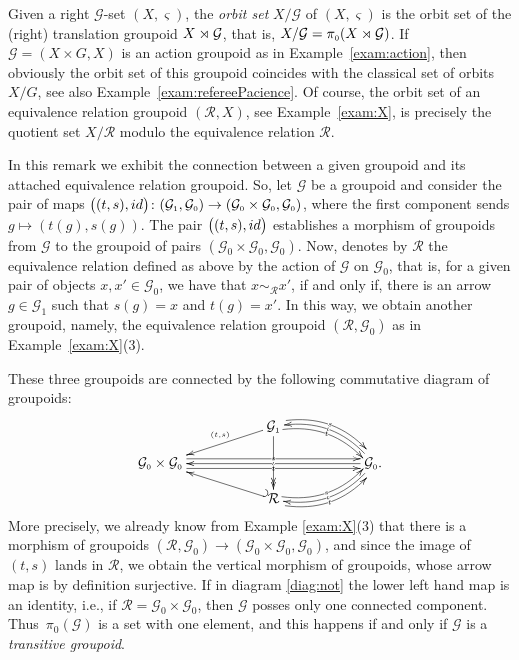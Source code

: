 \documentclass[11pt]{article}
\numberwithin{equation}{section}
\newcommand{\Go}{\cG_{\Sscript{0}}}
\newcommand{\Ga}{\cG_{\Sscript{1}}}
\newcommand{\cG}{{\mathcal G}}
\newcommand{\cR}{{\mathcal R}}
\newcommand{\Sscript}[1]{\scriptscriptstyle{#1}}
\begin{document}
Given a right $\cG$-set $(X,\varsigma)$, the \emph{orbit set} $X/\cG$ of $(X,\varsigma)$ is the orbit set of the (right) translation groupoid $X \rJoin \cG$, that is, $X/\cG=\pi_{\Sscript{0}}(X \rJoin \cG)$. If $\cG=(X\times G, X)$ is an action groupoid as in Example~\ref{exam:action}, then obviously the orbit set of this groupoid coincides with the classical set of orbits $X/G$, see also Example~\ref{exam:refereePacience}. Of course, the orbit set of an equivalence relation groupoid $(\cR, X)$, see Example~\ref{exam:X}, is precisely the quotient set $X/\cR$ modulo the equivalence relation $\cR$.

\begin{Remark}\label{rem:R} In this remark we exhibit the connection between a given groupoid and its attached equivalence relation groupoid. So, let $\cG$ be a groupoid and consider the pair of maps $\big( (t, s), {\rm id}\big)\colon (\Ga, \Go) \to (\Go \times \Go, \Go)$, where the first component sends $g \mapsto (t(g), s(g))$. The pair $\big( (t, s), {\rm id}\big)$ establishes a morphism of groupoids from $\cG$ to the groupoid of pairs $(\Go \times \Go, \Go)$. Now, denotes by $\cR$ the equivalence relation defined as above by the action of $\cG$ on $\Go$, that is, for a given pair of objects $ x, x' \in \Go$, we have that $x\sim_{\Sscript{\cR}} x'$, if and only if, there is an arrow $g \in \Ga$ such that $s(g)=x$ and $t(g)=x'$. In this way, we obtain another groupoid, namely, the equivalence relation groupoid $(\cR, \Go)$ as in Example~\ref{exam:X}(3).

These three groupoids are connected by the following commutative diagram of groupoids:
\begin{gather}\label{diag:not}
\begin{gathered}
\xymatrix@R=12pt{ & & \Ga \ar@{->}_-{\Sscript{(t,s)}}[lld] \ar@{->>}^{}[dd] |!{[dll];[drr]} \hole
\ar@/^1pc/@<0.80ex>@{->}|-{\scriptscriptstyle{{s}}}[rrd]
\ar@/^1pc/@<-0.80ex>@{->}|-{\scriptscriptstyle{{t}}}[rrd] & & \\
\Go \times \Go \ar@<0.80ex>@{->}|-{\scriptscriptstyle{{s}}}[rrrr]
\ar@<-0.80ex>@{->}|-{\scriptscriptstyle{{t}}}[rrrr] & & & &
\ar@{->}|-{\scriptscriptstyle{{\iota}}}[llll] \Go.
\ar@/^1pc/@{->}|-{\scriptscriptstyle{{\iota}}}[dll]
\ar@/_1pc/@{->}|-{\scriptscriptstyle{{\iota}}}[ull] \\ & & \cR
\ar@/_1pc/@<0.80ex>@{->}|-{\scriptscriptstyle{{s}}}[rru]
\ar@/_1pc/@<-0.80ex>@{->}|-{\scriptscriptstyle{{t}}}[rru]
\ar@{_{(}->}[llu] & & }
\end{gathered}
\end{gather}
More precisely, we already know from Example \ref{exam:X}(3) that there is a morphism of groupoids $(\cR, \Go) \to (\Go \times \Go, \Go)$, and since the image of $(t,s)$ lands in $\cR$, we obtain the vertical morphism of groupoids, whose arrow map is by definition surjective. If in diagram \eqref{diag:not} the lower left hand map is an identity, i.e., if $\cR=\Go \times \Go$, then $\cG$ posses only one connected component. Thus~$\pi_{\Sscript{0}}(\cG)$ is a set with one element, and this happens if and only if $\cG$ is a \emph{transitive groupoid}.


\end{Remark}
\end{document}
